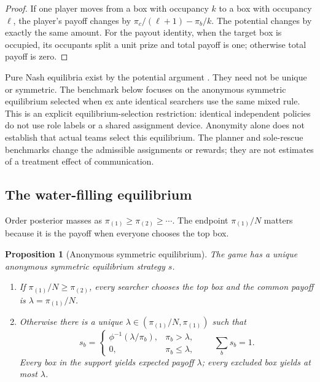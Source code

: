 \documentclass[11pt]{article}
\newtheorem{proposition}{Proposition}
\theoremstyle{definition}
\theoremstyle{remark}
\newcommand{\1}{\mathbf{1}}
\begin{document}
\begin{proof}
If one player moves from a box with occupancy $k$ to a box with occupancy $\ell$, the player's payoff changes by $\pi_c/(\ell+1)-\pi_b/k$. The potential changes by exactly the same amount. For the payout identity, when the target box is occupied, its occupants split a unit prize and total payoff is one; otherwise total payoff is zero.
\end{proof}

Pure Nash equilibria exist by the potential argument \citep{Rosenthal1973,MondererShapley1996}. They need not be unique or symmetric. The benchmark below focuses on the anonymous symmetric equilibrium selected when ex ante identical searchers use the same mixed rule. This is an explicit equilibrium-selection restriction: identical independent policies do not use role labels or a shared assignment device. Anonymity alone does not establish that actual teams select this equilibrium. The planner and sole-rescue benchmarks change the admissible assignments or rewards; they are not estimates of a treatment effect of communication.

\subsection{The water-filling equilibrium}

Order posterior masses as $\pi_{(1)}\ge\pi_{(2)}\ge\cdots$. The endpoint $\pi_{(1)}/N$ matters because it is the payoff when everyone chooses the top box.

\begin{proposition}[Anonymous symmetric equilibrium]
\label{prop:waterfill}
The game has a unique anonymous symmetric equilibrium strategy $s$.

\begin{enumerate}[label=(\roman*)]
\item If $\pi_{(1)}/N\ge\pi_{(2)}$, every searcher chooses the top box and the common payoff is $\lambda=\pi_{(1)}/N$.
\item Otherwise there is a unique $\lambda\in(\pi_{(1)}/N,\pi_{(1)})$ such that
\begin{equation}
s_b=
\begin{cases}
\phi^{-1}(\lambda/\pi_b), & \pi_b>\lambda,\\
0, & \pi_b\le\lambda,
\end{cases}
\qquad
\sum_b s_b=1.
\label{eq:waterfill}
\end{equation}
Every box in the support yields expected payoff $\lambda$; every excluded box yields at most $\lambda$.
\end{enumerate}
\end{proposition}
\end{document}
